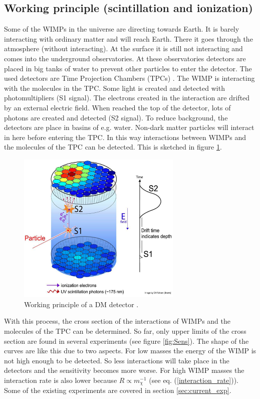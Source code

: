 \documentclass{article}
\begin{document}
\subsection{Working principle (scintillation and ionization)}
\label{sec:working_principle}
Some of the WIMPs in the universe are directing towards Earth. It is barely interacting with ordinary matter and will reach Earth. There it goes through the atmosphere (without interacting). At the surface it is still not interacting and comes into the underground observatories. At these observatories detectors are placed in big tanks of water to prevent other particles to enter the detector. The used detectors are Time Projection Chambers (TPCs) \cite{Akerib:2015gmi}. The WIMP is interacting with the molecules in the TPC. Some light is created and detected with photomultipliers (S1 signal). The electrons created in the interaction are drifted by an external electric field. When reached the top of the detector, lots of photons are created and detected (S2 signal). To reduce background, the detectors are place in basins of e.g. water. Non-dark matter particles will interact in here before entering the TPC. In this way interactions between WIMPs and the molecules of the TPC can be detected. This is sketched in figure \ref{fig:working}.

\begin{figure}[h]
    \centering
    \includegraphics[width=0.7\textwidth]{Principle3.png}
    \caption{Working principle of a DM detector \cite{Akerib:2015gmi}.}
    \label{fig:working}
\end{figure}

With this process, the cross section of the interactions of WIMPs and the molecules of the TPC can be determined. So far, only upper limits of the cross section are found in several experiments (see figure \ref{fig:Sens}). The shape of the curves are like this due to two aspects. For low masses the energy of the WIMP is not high enough to be detected. So less interactions will take place in the detectors and the sensitivity becomes more worse. For high WIMP masses the interaction rate is also lower because $R\propto m_\chi^{-1}$ (see eq. (\ref{interaction_rate})).
Some of the existing experiments are covered in section \ref{sec:current_exp}.
\end{document}
